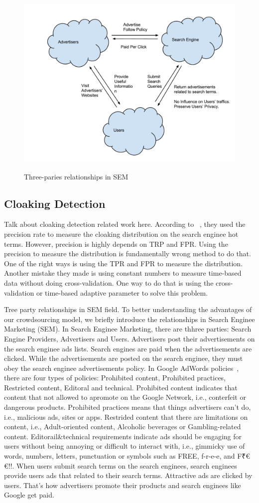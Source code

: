 \begin{figure}[t]
	\centering
	\includegraphics[width=.5\textwidth]{fig/three-parties}
	\label{fig:sem-model}
	\caption{Three-paries relationships in SEM}
\end{figure}

\subsection{Cloaking Detection}
Talk about cloaking detection related work here.
According to ~\cite{wang2011cloak}, they used the precision rate to measure the cloaking distribution on the search enginee hot terms. However, precision is highly depends on TRP and FPR. Using the precision to measure the distribution is fundamentally wrong method to do that. One of the right ways is using the TPR and FPR to measure the distribution. Another mistake they made is using constant numbers to measure time-based data without doing cross-validation. One way to do that is using the cross-validation or time-based adaptive parameter to solve this problem. 

Tree party relationships in SEM field. 
To better understanding the advantages of our crowdsourcing model, we briefly introduce the relationships in Search Enginee Marketing (SEM). In Search Enginee Marketing, there are thhree parties: Search Engine Providers, Advertisers and Users. Advertisers post their advertisements on the search enginee ads lists. Search engines are paid when the advertisements are clicked. While the advertisements are posted on the search enginee, they must obey the search enginee advertisements policy. In Google AdWords policies~\cite{google-ads-policy}, there are four types of policies: Prohibited content, Prohibited practices, Restricted content, Editoral and technical. Prohibited content indicates that content that not allowed to apromote on the Google Network, i.e., conterfeit or dangerous products. Prohibited practices means that things advertisers can't do, i.e., malicious ads, sites or apps. Restrided content that there are limitations on content, i.e., Adult-oriented content, Alcoholic beverages or Gambling-related content. Editorail\&technical requirements indicate ads should be engaging for users without being annoying or difficult to interact with, i.e., gimmicky use of words, numbers, letters, punctuation or symbols such as FREE, f-r-e-e, and F₹€€!!. When users submit search terms on the search enginees, search enginees provide users ads that related to their search terms. Attractive ads are clicked by users. That's how advertisers promote their products and search enginees like Google get paid. 

